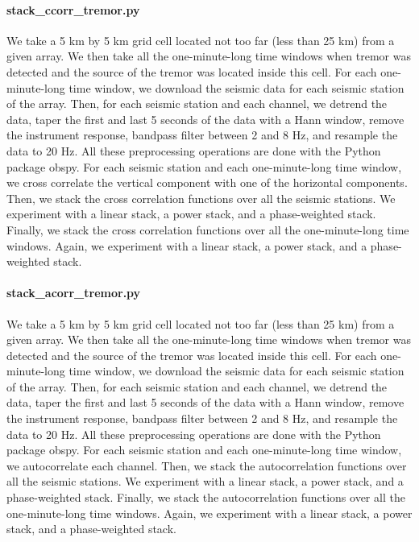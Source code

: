 \documentclass[workdone.tex]{subfiles}
\begin{document}
\paragraph{stack\_ccorr\_tremor.py} We take a 5 km by 5 km grid cell located not too far (less than 25 km) from a given array. We then take all the one-minute-long time windows when tremor was detected and the source of the tremor was located inside this cell. For each one-minute-long time window, we download the seismic data for each seismic station of the array. Then, for each seismic station and each channel, we detrend the data, taper the first and last 5 seconds of the data with a Hann window, remove the instrument response, bandpass filter between 2 and 8 Hz, and resample the data to 20 Hz. All these preprocessing operations are done with the Python package obspy. For each seismic station and each one-minute-long time window, we cross correlate the vertical component with one of the horizontal components. Then, we stack the cross correlation functions over all the seismic stations. We experiment with a linear stack, a power stack, and a phase-weighted stack. Finally, we stack the cross correlation functions over all the one-minute-long time windows. Again, we experiment with a linear stack, a power stack, and a phase-weighted stack.

\paragraph{stack\_acorr\_tremor.py} We take a 5 km by 5 km grid cell located not too far (less than 25 km) from a given array. We then take all the one-minute-long time windows when tremor was detected and the source of the tremor was located inside this cell. For each one-minute-long time window, we download the seismic data for each seismic station of the array. Then, for each seismic station and each channel, we detrend the data, taper the first and last 5 seconds of the data with a Hann window, remove the instrument response, bandpass filter between 2 and 8 Hz, and resample the data to 20 Hz. All these preprocessing operations are done with the Python package obspy. For each seismic station and each one-minute-long time window, we autocorrelate each channel. Then, we stack the autocorrelation functions over all the seismic stations. We experiment with a linear stack, a power stack, and a phase-weighted stack. Finally, we stack the autocorrelation functions over all the one-minute-long time windows. Again, we experiment with a linear stack, a power stack, and a phase-weighted stack.
\end{document}
